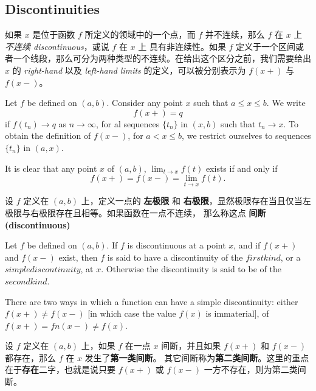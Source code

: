 \documentclass[../poma-notes.tex]{subfiles}
\begin{document}
\subsection*{Discontinuities}

如果 $x$ 是位于函数 $f$ 所定义的领域中的一个点，而 $f$ 并不连续，那么 $f$ 在 $x$ 上 \textit{不连续 discontinuous}，或说 $f$ 在 $x$ 上
具有非连续性。如果 $f$ 定义于一个区间或者一个线段，那么可分为两种类型的不连续。在给出这个区分之前，我们需要给出 $x$ 的 \textit{right-hand}
以及 \textit{left-hand limits} 的定义，可以被分别表示为 $f(x+)$ 与 $f(x-)$。

\begin{definition}
  Let $f$ be defined on $(a, b)$. Consider any point $x$ such that $a \le x \le b$. We write
  \[
    f(x+) = q
  \]
  if $f(t_n) \to q$ as $n \to \infty$, for al sequences $\{t_n\}$ in $(x, b)$ such that $t_n \to x$. To obtain the definition
  of $f(x-)$, for $a < x \le b$, we restrict ourselves to sequences $\{t_n\}$ in $(a, x)$.

  It is clear that any point $x$ of $(a, b)$, $\lim_{t \to x} f(t)$ exists if and only if
  \[
    f(x+) = f(x-) = \lim_{t \to x} f(t).
  \]
\end{definition}

\begin{anote}
  设 $f$ 定义在 $(a, b)$ 上，定义一点的 \textbf{左极限} 和 \textbf{右极限}，显然极限存在当且仅当左极限与右极限存在且相等。如果函数在一点不连续，
  那么称这点 \textbf{间断 (discontinuous)}
\end{anote}

\begin{definition}
  Let $f$ be defined on $(a, b)$. If $f$ is discontinuous at a point $x$, and if $f(x+)$ and $f(x-)$ exist, then $f$ is said to
  have a discontinuity of the $first kind$, or a $simple discontinuity$, at $x$. Otherwise the discontinuity is said to be of
  the $second kind$.

  There are two ways in which a function can have a simple discontinuity: either $f(x+) \ne f(x-)$ [in which case the value
      $f(x)$ is immaterial], of $f(x+) = fn(x-) \ne f(x)$.
\end{definition}

\begin{anote}
  设 $f$ 定义在 $(a, b)$ 上，如果 $f$ 在一点 $x$ 间断，并且如果 $f(x+)$ 和 $f(x-)$ 都存在，那么 $f$ 在 $x$ 发生了\textbf{第一类间断}。
  其它间断称为\textbf{第二类间断}。这里的重点在于\textbf{存在}二字，也就是说只要 $f(x+)$ 或 $f(x-)$ 一方不存在，则为第二类间断。
\end{anote}
\end{document}
